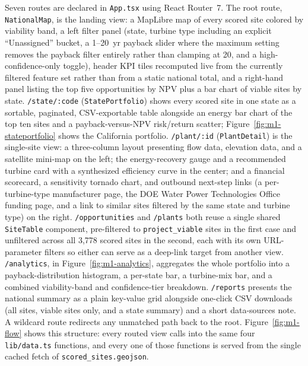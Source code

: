 \documentclass[12pt,letterpaper]{report}
\begin{document}
Seven routes are declared in \texttt{App.tsx} using React Router~7. The
root route, \texttt{NationalMap}, is the landing view: a MapLibre map of
every scored site colored by viability band, a left filter panel (state,
turbine type including an explicit ``Unassigned'' bucket, a 1--20~yr payback
slider where the maximum setting removes the payback filter entirely rather
than clamping at 20, and a high-confidence-only toggle), header KPI tiles
recomputed live from the currently filtered feature set rather than from a
static national total, and a right-hand panel listing the top five
opportunities by NPV plus a bar chart of viable sites by state.
\texttt{/state/:code} (\texttt{StatePortfolio}) shows every scored site in
one state as a sortable, paginated, CSV-exportable table alongside an
energy bar chart of the top ten sites and a payback-versus-NPV risk/return
scatter; Figure~\ref{fig:m1-stateportfolio} shows the California portfolio.
\texttt{/plant/:id} (\texttt{PlantDetail}) is the single-site
view: a three-column layout presenting flow data, elevation data, and a
satellite mini-map on the left; the energy-recovery gauge and a recommended
turbine card with a synthesized efficiency curve in the center; and a
financial scorecard, a sensitivity tornado chart, and outbound
next-step links (a per-turbine-type manufacturer page, the DOE Water Power
Technologies Office funding page, and a link to similar sites filtered by
the same state and turbine type) on the right. \texttt{/opportunities} and
\texttt{/plants} both reuse a single shared \texttt{SiteTable} component,
pre-filtered to \texttt{project\_viable} sites in the first case and
unfiltered across all 3{,}778 scored sites in the second, each with its own
URL-parameter filters so either can serve as a deep-link target from
another view. \texttt{/analytics}, in Figure~\ref{fig:m1-analytics}, aggregates the whole
portfolio into a payback-distribution histogram, a per-state bar, a
turbine-mix bar, and a combined viability-band and confidence-tier
breakdown. \texttt{/reports}
presents the national summary as a plain key-value grid alongside one-click
CSV downloads (all sites, viable sites only, and a state summary) and a
short data-sources note. A wildcard route redirects any unmatched path back
to the root. Figure~\ref{fig:m1-flow} shows this structure: every routed
view calls into the same four \texttt{lib/data.ts} functions, and every one
of those functions is served from the single cached fetch of
\texttt{scored\_sites.geojson}.
\end{document}
